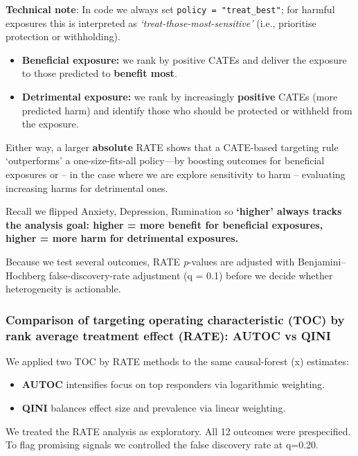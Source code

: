 \documentclass[
  single column]{article}
\providecommand{\tightlist}{%
  \setlength{\itemsep}{0pt}\setlength{\parskip}{0pt}}
\begin{document}
\textbf{Technical note}: In code we always set
\texttt{policy\ =\ "treat\_best"}; for harmful exposures this is
interpreted as \emph{`treat-those-most-sensitive'} (i.e., prioritise
protection or withholding).

\begin{itemize}
\tightlist
\item
  \textbf{Beneficial exposure:} we rank by positive CATEs and deliver
  the exposure to those predicted to \textbf{benefit most}.
\item
  \textbf{Detrimental exposure:} we rank by increasingly
  \textbf{positive} CATEs (more predicted harm) and identify those who
  should be protected or withheld from the exposure.
\end{itemize}

Either way, a larger \textbf{absolute} RATE shows that a CATE-based
targeting rule `outperforms' a one-size-fits-all policy---by boosting
outcomes for beneficial exposures or -- in the case where we are explore
sensitivity to harm -- evaluating increasing harms for detrimental ones.

Recall we flipped Anxiety, Depression, Rumination so \textbf{`higher'
always tracks the analysis goal: higher = more benefit for beneficial
exposures, higher = more harm for detrimental exposures.}

Because we test several outcomes, RATE \emph{p}-values are adjusted with
Benjamini--Hochberg false-discovery-rate adjustment (q = 0.1) before we
decide whether heterogeneity is actionable.

\subsubsection{Comparison of targeting operating characteristic (TOC) by
rank average treatment effect (RATE): AUTOC vs
QINI}\label{comparison-of-targeting-operating-characteristic-toc-by-rank-average-treatment-effect-rate-autoc-vs-qini}

We applied two TOC by RATE methods to the same causal-forest \tau(x)
estimates:

\begin{itemize}
\item
  \textbf{AUTOC} intensifies focus on top responders via logarithmic
  weighting.
\item
  \textbf{QINI} balances effect size and prevalence via linear
  weighting.
\end{itemize}

We treated the RATE analysis as exploratory. All 12 outcomes were
prespecified. To flag promising signals we controlled the false
discovery rate at q=0.20.
\end{document}
